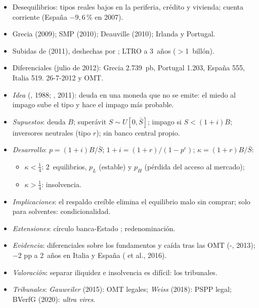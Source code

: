 \documentclass{article}
\begin{document}
\begin{columnas}
\begin{itemize}
\item Desequilibrios: tipos reales bajos en la periferia, crédito y vivienda; cuenta corriente (España $-9{,}6$\,\% en 2007).
\item Grecia (2009); SMP (2010); Deauville (2010); Irlanda y Portugal.
\item Subidas de  (2011), deshechas por ; LTRO a 3~años ($>$1~billón).
\item Diferenciales (julio de 2012): Grecia 2.739~pb, Portugal 1.203, España 555, Italia 519. 26-7-2012 y OMT.
\end{itemize}
\begin{itemize}
\item \emph{Idea} (, 1988; , 2011): deuda en una moneda que no se emite: el miedo al impago sube el tipo y hace el impago más probable.
\item \emph{Supuestos}: deuda $B$; superávit $S\sim U[0,\bar S]$; impago si $S<(1+i)B$; inversores neutrales (tipo $r$); sin banco central propio.
\item \emph{Desarrollo}: $p=(1+i)B/\bar S$; $1+i=(1+r)/(1-p^e)$; $\kappa=(1+r)B/\bar S$:
  \begin{itemize}
  \item $\kappa<\tfrac14$: 2~equilibrios, $p_L$ (estable) y $p_H$ (pérdida del acceso al mercado);
  \item $\kappa>\tfrac14$: insolvencia.
  \end{itemize}
\item \emph{Implicaciones}: el respaldo creíble elimina el equilibrio malo sin comprar; solo para solventes: condicionalidad.
\item \emph{Extensiones}: círculo banca-Estado ; redenominación.
\item \emph{Evidencia}: diferenciales sobre los fundamentos y caída tras las OMT (-, 2013); $-2$ pp a 2~años en Italia y España ( et al., 2016).
\item \emph{Valoración}: separar iliquidez e insolvencia es difícil: los tribunales.
\end{itemize}
\begin{itemize}
\item \emph{Tribunales}: \emph{Gauweiler} (2015): OMT legales; \emph{Weiss} (2018): PSPP legal; BVerfG (2020): \emph{ultra vires}.
\end{itemize}


\end{columnas}
\end{document}
